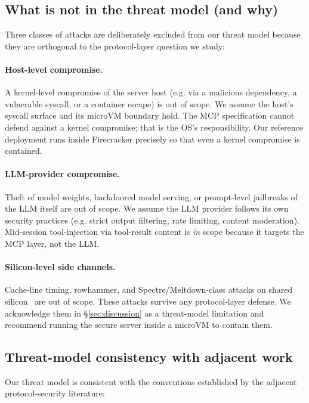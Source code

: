 \subsection{What is not in the threat model (and why)}

Three classes of attacks are deliberately excluded from our
threat model because they are orthogonal to the protocol-layer
question we study:

\paragraph{Host-level compromise.} A kernel-level compromise
of the server host (e.g. via a malicious dependency, a
vulnerable syscall, or a container escape) is out of scope. We
assume the host's syscall surface and its microVM boundary
hold. The MCP specification cannot defend against a kernel
compromise; that is the OS's responsibility. Our reference
deployment runs inside Firecracker precisely so that even a
kernel compromise is contained.

\paragraph{LLM-provider compromise.} Theft of model weights,
backdoored model serving, or prompt-level jailbreaks of the
LLM itself are out of scope. We assume the LLM provider follows
its own security practices (e.g. strict output filtering,
rate limiting, content moderation). Mid-session tool-injection
via tool-result content is \emph{in} scope because it targets
the MCP layer, not the LLM.

\paragraph{Silicon-level side channels.} Cache-line timing,
rowhammer, and Spectre/Meltdown-class attacks on shared
silicon~\cite{dipta_2024_sandbox} are out of scope. These
attacks survive any protocol-layer defense. We acknowledge
them in \S\ref{sec:discussion} as a threat-model limitation
and recommend running the secure server inside a microVM to
contain them.

\subsection{Threat-model consistency with adjacent work}

Our threat model is consistent with the conventions established
by the adjacent protocol-security literature:

